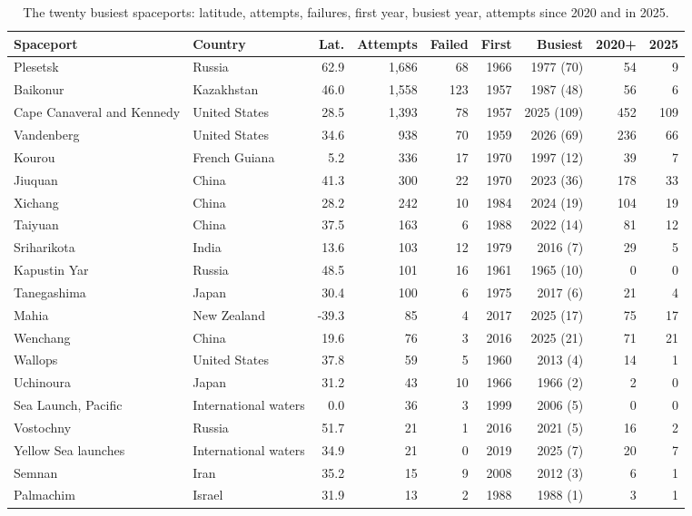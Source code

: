 \documentclass[11pt,a4paper]{article}
\begin{document}
\begin{table}[tbp]\centering\footnotesize\setlength{\tabcolsep}{4pt}\caption{The twenty busiest spaceports: latitude, attempts, failures, first year, busiest year, attempts since 2020 and in 2025.}\label{tab:ports}\begin{tabular}{llrrrrrrr}\toprule Spaceport & Country & Lat. & Attempts & Failed & First & Busiest & 2020+ & 2025\\\midrule
Plesetsk & Russia & 62.9 & 1,686 & 68 & 1966 & 1977 (70) & 54 & 9\\
Baikonur & Kazakhstan & 46.0 & 1,558 & 123 & 1957 & 1987 (48) & 56 & 6\\
Cape Canaveral and Kennedy & United States & 28.5 & 1,393 & 78 & 1957 & 2025 (109) & 452 & 109\\
Vandenberg & United States & 34.6 & 938 & 70 & 1959 & 2026 (69) & 236 & 66\\
Kourou & French Guiana & 5.2 & 336 & 17 & 1970 & 1997 (12) & 39 & 7\\
Jiuquan & China & 41.3 & 300 & 22 & 1970 & 2023 (36) & 178 & 33\\
Xichang & China & 28.2 & 242 & 10 & 1984 & 2024 (19) & 104 & 19\\
Taiyuan & China & 37.5 & 163 & 6 & 1988 & 2022 (14) & 81 & 12\\
Sriharikota & India & 13.6 & 103 & 12 & 1979 & 2016 (7) & 29 & 5\\
Kapustin Yar & Russia & 48.5 & 101 & 16 & 1961 & 1965 (10) & 0 & 0\\
Tanegashima & Japan & 30.4 & 100 & 6 & 1975 & 2017 (6) & 21 & 4\\
Mahia & New Zealand & -39.3 & 85 & 4 & 2017 & 2025 (17) & 75 & 17\\
Wenchang & China & 19.6 & 76 & 3 & 2016 & 2025 (21) & 71 & 21\\
Wallops & United States & 37.8 & 59 & 5 & 1960 & 2013 (4) & 14 & 1\\
Uchinoura & Japan & 31.2 & 43 & 10 & 1966 & 1966 (2) & 2 & 0\\
Sea Launch, Pacific & International waters & 0.0 & 36 & 3 & 1999 & 2006 (5) & 0 & 0\\
Vostochny & Russia & 51.7 & 21 & 1 & 2016 & 2021 (5) & 16 & 2\\
Yellow Sea launches & International waters & 34.9 & 21 & 0 & 2019 & 2025 (7) & 20 & 7\\
Semnan & Iran & 35.2 & 15 & 9 & 2008 & 2012 (3) & 6 & 1\\
Palmachim & Israel & 31.9 & 13 & 2 & 1988 & 1988 (1) & 3 & 1\\
\bottomrule\end{tabular}\end{table}
\end{document}
